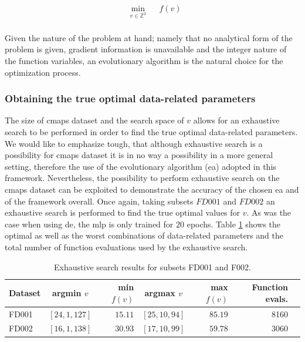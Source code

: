 \begin{equation}
\begin{aligned}
& \underset{v \in \mathbb{Z}^3}{\text{min}}
& & f(v) \\
\end{aligned}
\label{eq:optimization_problem}
\end{equation}

Given the nature of the problem at hand; namely that no analytical form of the problem is given, gradient information is unavailable and the integer nature of the function variables, an evolutionary algorithm is the natural choice for the optimization process.

\subsubsection{Obtaining the true optimal data-related parameters}

The size of \gls{cmaps} dataset and the search space of $v$ allows for an exhaustive search to be performed in order to find the true optimal data-related parameters. We would like to emphasize tough, that although exhaustive search is a possibility for \gls{cmaps} dataset it is in no way a possibility in a more general setting, therefore the use of the evolutionary algorithm (\gls{ea}) adopted in this framework. Nevertheless, the possibility to perform exhaustive search on the \gls{cmaps} dataset can be exploited to demonstrate the accuracy of the chosen \gls{ea} and of the framework overall. Once again, taking subsets $FD001$ and $FD002$ an exhaustive search is performed to find the true optimal values for $v$. As was the case when using \gls{de}, the \gls{mlp} is only trained for $20$ epochs. Table \ref{table:true_optimal_data_params} shows the optimal as well as the worst combinations of data-related parameters and the total number of function evaluations used by the exhaustive search.

\begin{table}[!htb]
\centering
\begin{tabular}{l | c r c r r l}
	\hline
	 Dataset & argmin $v$ & min $f(v)$ & argmax $v$ & max $f(v)$ & Function evals.\\
  	\hline
  	FD001 & $\left[ 24, 1, 127 \right]$ & $15.11$ & $\left[ 25, 10, 94 \right]$ & $85.19$ & 8160\\
  	FD002 & $\left[ 16, 1, 138 \right]$ & $30.93$ & $\left[ 17, 10, 99 \right]$ & $59.78$ & 3060\\
  	\hline
\end{tabular}
\caption{Exhaustive search results for subsets FD001 and F002.}
\label{table:true_optimal_data_params}
\end{table}

